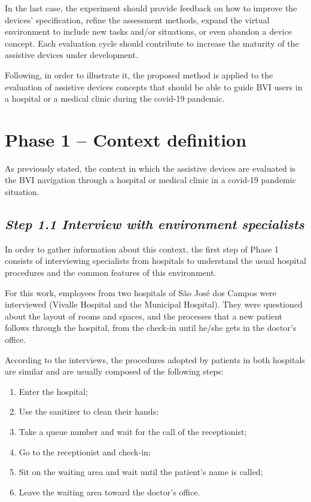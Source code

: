 In the last case, the experiment should provide feedback on how to improve the devices’ specification, refine the assessment methods, expand the virtual environment to include new tasks and/or situations, or even abandon a device concept. Each evaluation cycle should contribute to increase the maturity of the assistive devices under development.

Following, in order to illustrate it, the proposed method is applied to the evaluation of assistive devices concepts that should be able to guide BVI users in a hospital or a medical clinic during the covid-19 pandemic.

\section{Phase 1 – Context definition}
\label{sec:interviews_phase}
    As previously stated, the context in which the assistive devices are evaluated is the BVI navigation through a hospital or medical clinic in a covid-19 pandemic situation. 

    \subsection*{\textit{Step 1.1 Interview with environment specialists}}
    
        In order to gather information about this context, the first step of Phase 1 consists of interviewing specialists from hospitals to understand the usual hospital procedures and the common features of this environment.
        
        For this work, employees from two hospitals of São José dos Campos were interviewed (Vivalle Hospital and the Municipal Hospital). They were questioned about the layout of rooms and spaces, and the processes that a new patient follows through the hospital, from the check-in until he/she gets in the doctor’s office. 

        According to the interviews, the procedures adopted by patients in both hospitals are similar and are usually composed of the following steps:

        \begin{enumerate}
            \item Enter the hospital;
            \item Use the sanitizer to clean their hands;
            \item Take a queue number and wait for the call of the receptionist;
            \item Go to the receptionist and check-in;
            \item Sit on the waiting area and wait until the patient’s name is called;
            \item Leave the waiting area toward the doctor's office.            
        \end{enumerate}


